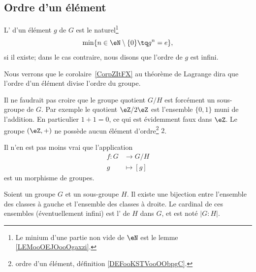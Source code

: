 \subsection{Ordre d'un élément}

\begin{definition}      \label{DEFooKSTVooOObpgC}
	L' d'un élément \( g\) de \( G\) est le naturel\footnote{Le minium d'une partie non vide de \( \eN\) est le lemme \ref{LEMooOEJOooOgaxzi}.}
	\begin{equation}
		\min\{ n\in\eN\setminus\{ 0 \}\tq g^n=e \},
	\end{equation}
	si il existe; dans le cas contraire, nous disons que l'ordre de \( g\) est infini.
\end{definition}

\begin{normaltext}
	Nous verrons que le corolaire~\ref{CorpZItFX} au théorème de Lagrange dira que l'ordre d'un élément divise l'ordre du groupe.
\end{normaltext}




\begin{example}      \label{EXooFNIKooHxePSs}
	Il ne faudrait pas croire que le groupe quotient \( G/H\) est forcément un sous-groupe de \( G\). Par exemple le quotient \( \eZ/2\eZ\) est l'ensemble \( \{ 0,1 \}\) muni de l'addition. En particulier \( 1+1=0\), ce qui est évidemment faux dans \( \eZ\). Le groupe \( (\eZ,+)\) ne possède aucun élément d'ordre\footnote{ordre d'un élément, définition \ref{DEFooKSTVooOObpgC}.} \( 2\).

	Il n'en est pas moins vrai que l'application
	\begin{equation}
		\begin{aligned}
			f\colon G & \to G/H     \\
			g         & \mapsto [g]
		\end{aligned}
	\end{equation}
	est un morphisme de groupes.
\end{example}


\begin{propositionDef}	\label{PROPooAHFGooAkMmlD}
	Soient un groupe \( G\) et un sous-groupe \(H\). Il existe une bijection entre l'ensemble des classes à gauche et l'ensemble des classes à droite. Le cardinal de ces ensembles (éventuellement infini) est l' de \( H\) dans \( G\), et est noté \( | G:H |\).
\end{propositionDef}


